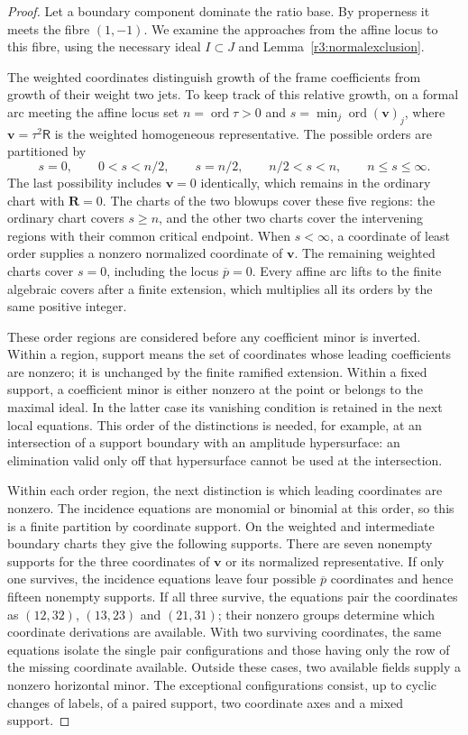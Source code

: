 \documentclass[11pt,a4paper]{article}
\numberwithin{equation}{section}
\theoremstyle{plain}
\theoremstyle{definition}
\theoremstyle{remark}
\begin{document}
\begin{proof}
Let a boundary component dominate the ratio base. By properness
it meets the fibre $(1,-1)$. We examine the approaches
from the affine locus to this fibre, using the necessary ideal
$I\subset J$ and Lemma~\ref{r3:normalexclusion}.

The weighted coordinates distinguish growth of the frame coefficients
from growth of their weight two jets. To keep track of this relative
growth, on a formal arc meeting the affine locus set
$n=\operatorname{ord}\tau>0$ and
$s=\min_j\operatorname{ord}(\boldsymbol v)_j$, where
$\boldsymbol v=\tau^2\mathsf R$ is the weighted homogeneous
representative. The possible orders are partitioned by
\[
 s=0,\qquad 0<s<n/2,\qquad s=n/2,\qquad
 n/2<s<n,\qquad n\le s\le\infty.
\]
The last possibility includes $\boldsymbol v=0$ identically, which
remains in the ordinary chart with $\boldsymbol R=0$.
The charts of the two blowups cover these five regions: the
ordinary chart covers $s\ge n$, and the other two charts cover
the intervening regions with their common critical endpoint.
When $s<\infty$, a coordinate of least order supplies a nonzero
normalized coordinate of $\boldsymbol v$. The remaining weighted charts cover
$s=0$, including the locus $\overline p=0$.
Every affine arc lifts to the finite algebraic covers after a finite
extension, which multiplies all its orders by the same positive integer.

These order regions are considered before any coefficient minor
is inverted. Within a region, support means the set of coordinates
whose leading coefficients are nonzero; it is unchanged by the
finite ramified extension. Within a fixed support, a coefficient
minor is either nonzero at the point or belongs to the maximal
ideal. In the latter case its vanishing condition is retained in
the next local equations. This order of the distinctions is
needed, for example, at an intersection of a support boundary
with an amplitude hypersurface: an elimination valid only off
that hypersurface cannot be used at the intersection.

Within each order region, the next distinction is which leading
coordinates are nonzero. The incidence equations are monomial or
binomial at this order, so this is a finite partition by coordinate
support. On the weighted and intermediate boundary charts they give
the following supports.
There are seven nonempty supports for the three coordinates of
$\boldsymbol v$ or its normalized representative. If only one
survives, the incidence equations leave
four possible $\overline p$ coordinates and hence fifteen nonempty
supports. If all three survive, the equations pair the coordinates
as $(12,32)$, $(13,23)$ and $(21,31)$; their nonzero groups determine
which coordinate derivations are available. With two surviving
coordinates, the same equations isolate the single pair configurations
and those having only the row of the missing coordinate
available. Outside these cases, two available fields supply a nonzero
horizontal minor. The exceptional configurations consist, up to cyclic changes
of labels, of a paired support, two coordinate axes and a mixed
support.


\end{proof}
\end{document}
